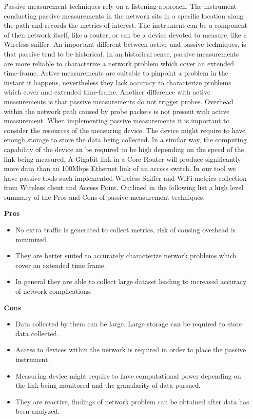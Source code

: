 Passive measurement techniques rely on a listening approach. The instrument conducting passive measurements in the network sits in a specific location along the path and records the metrics of interest. The instrument can be a component of then network itself, like a router, or can be a device devoted to measure, like a Wireless sniffer. An important different between active and passive techniques, is that passive tend to be historical. In an historical sense, passive measurements are more reliable to characterize a network problem which cover an extended time-frame. Active measurements are suitable to pinpoint a problem in the instant it happens, nevertheless they lack accuracy to characterize problems which cover and extended time-frame. Another difference with active measurements is that passive measurements do not trigger probes. Overhead within the network path caused by probe packets is not present with active measurement. When implementing passive measurements it is important to consider the resources of the measuring device. The device might require to have enough storage to store the data being collected. In a similar way, the computing capability of the device an be required to be high depending on the speed of the link being measured. A Gigabit link in a Core Router will produce significantly more data than an 100Mbps Ethernet link of an access switch. In our tool we have passive tools such implemented Wireless Sniffer and WiFi metrics collection from Wireless client and Access Point.
Outlined in the following list a high level summary of the Pros and Cons of passive measurement techniques.

\textbf{Pros}
\begin{itemize}
	\item No extra traffic is generated to collect metrics, risk of causing overhead is minimized.
	\item They are better suited to accurately characterize network problems which cover an extended time frame.
	\item In general they are able to collect large dataset leading to increased accuracy of network complications.

\end{itemize}


\textbf{Cons}
\begin{itemize}
	\item Data collected by them can be large. Large storage can be required to store data collected.
	\item Access to devices within the network is required in order to place the passive instrument.
	\item Measuring device might require to have computational power depending on the link being monitored and the granularity of data pursued.
	\item They are reactive, findings of network problem can be obtained after data has been analyzed.
	
\end{itemize}

